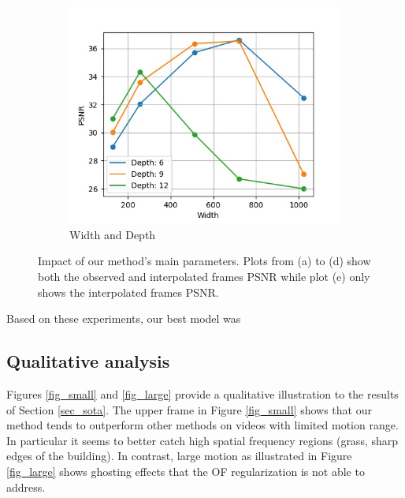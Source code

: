 \documentclass{article}
\begin{document}
\begin{figure}[h]
\begin{subfigure}{0.3\textwidth}
\includegraphics[width=1\linewidth]{Width_Depth.jpg}
    \caption{Width and Depth}
\end{subfigure}
\caption{Impact of our method's main parameters. Plots from (a) to (d)
show both the observed and interpolated frames PSNR
while plot (e) only shows the interpolated frames PSNR.}
\label{fig_abl}
\end{figure}

Based on these experiments, our best model was

\subsection{Qualitative analysis}
\label{sec_qua}

Figures \ref{fig_small} and \ref{fig_large} provide a qualitative illustration to the results of Section \ref{sec_sota}.
The upper frame in Figure \ref{fig_small} shows that our method tends to outperform other methods on videos with limited motion range.
In particular it seems to better catch high spatial frequency regions (grass, sharp edges of the building).
In contrast, large motion as illustrated in Figure \ref{fig_large} shows ghosting effects that the OF regularization is not able to address.
\end{document}
